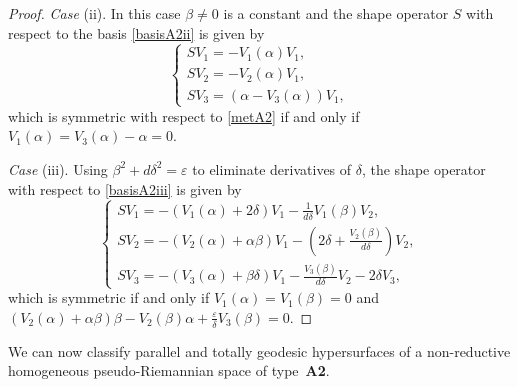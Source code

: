\documentclass{amsart}
\theoremstyle{plain}
\theoremstyle{remark}
\begin{document}
{\begin{proof}
\smallskip 
{\em Case} (ii). In this case $\beta \neq 0$ is a constant and the shape operator $S$ with respect to the basis \eqref{basisA2ii} is given by
\begin{equation}\label{sA2ii}
\left\{
\begin{array}{l}
SV_1 =  - V_1(\alpha) V_1, \\[2 pt]
SV_2 =  -V_2(\alpha) V_1, \\[2 pt]
SV_3 =  \left(\alpha - V_3(\alpha) \right) V_1,
\end{array}
\right.
\end{equation}
which is symmetric with respect to \eqref{metA2} if and only if $V_1(\alpha)=V_3(\alpha)-\alpha=0$. 

\smallskip
{\em Case} (iii). Using $\beta^2 + d \delta^2 = \varepsilon$ to eliminate derivatives of $\delta$,  the shape operator with respect to \eqref{basisA2iii} is given by 
\begin{equation}\label{sA2iii}
\left\{
\begin{array}{l}
SV_1 =  -(V_1(\alpha)+2\delta) V_1 -\frac{1}{d\delta}V_1(\beta) V_2, \\[2 pt]
SV_2 =  -(V_2(\alpha)+\alpha\beta) V_1  - \left(2\delta+\frac{V_2(\beta)}{d\delta} \right)V_2, \\[2 pt]
SV_3 =  -\left(V_3(\alpha) +\beta \delta \right) V_1 - \frac{V_3(\beta)}{d\delta} V_2 - 2\delta V_3,
\end{array}
\right.
\end{equation}
which is symmetric if and only if $V_1(\alpha) =V_1(\beta) =0$ and $(V_2(\alpha)+\alpha\beta)\beta - V_2(\beta)\alpha + \frac{\varepsilon}{\delta}V_3(\beta) =0$.
\end{proof}

We can now classify parallel and totally geodesic hypersurfaces of a non-reductive homogeneous pseudo-Riemannian space of type~\textbf{A2}. 

}
\end{document}
